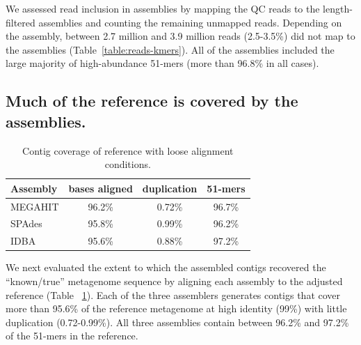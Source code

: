 \documentclass[11pt]{article}
\begin{document}
We assessed read inclusion in assemblies by mapping the QC reads to
the length-filtered assemblies and counting the remaining unmapped
reads. Depending on the assembly, between 2.7 million and 3.9 million
reads (2.5-3.5\%) did not map to the assemblies
(Table~\ref{table:reads-kmers}).  All of the assemblies included the large
majority of high-abundance 51-mers (more than 96.8\% in all cases).

\subsection*{Much of the reference is covered by the assemblies.}




\begin{table}[!h]
\centering
\caption{Contig coverage of reference with loose alignment conditions.}
\begin{tabular}{|l|c|c|c|}\hline
  \textbf{Assembly} & \textbf{bases aligned} & \textbf{duplication}
  & \textbf{51-mers}
  \\ \hline
MEGAHIT & 96.2\% & 0.72\% & 96.7\% \\ \hline
SPAdes  & 95.8\% & 0.99\% & 96.2\% \\ \hline
IDBA    & 95.6\% & 0.88\% & 97.2\% \\ \hline
\end{tabular}
\label{table:contig-coverage}
\end{table}


We next evaluated the extent to which the assembled contigs recovered the
``known/true'' metagenome sequence by aligning each assembly to the
adjusted reference (Table ~\ref{table:contig-coverage}).  Each of the three
assemblers generates contigs that cover more than 95.6\% of the reference
metagenome at high identity (99\%) with little duplication
(0.72-0.99\%).  All three assemblies contain between 96.2\% and 97.2\% of
the 51-mers in the reference.
\end{document}
